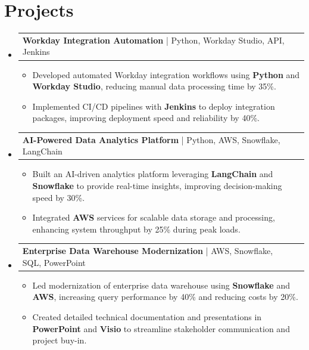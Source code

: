 \documentclass[letterpaper,11pt]{article}
\makeatletter
\newcommand{\resumeItem}[1]{
  \item\footnotesize{
    {#1 \vspace{-2pt}}
  }
}
\newcommand{\resumeProjectHeading}[2]{
    \item
    \begin{tabular*}{1.001\textwidth}{l@{\extracolsep{\fill}}r}
      \small#1 & \textbf{\small #2}\\
    \end{tabular*}\vspace{-7pt}
}
\newcommand{\resumeSubHeadingListStart}{\begin{itemize}[leftmargin=0pt, label={}]}
\newcommand{\resumeSubHeadingListEnd}{\end{itemize}}
\newcommand{\resumeItemListStart}{\begin{itemize}[leftmargin=*]}
\newcommand{\resumeItemListEnd}{\end{itemize}\vspace{-5pt}}
\makeatother
\begin{document}
\section{Projects}
    \vspace{-5pt}
    \resumeSubHeadingListStart

      \resumeProjectHeading
          {\textbf{Workday Integration Automation} | Python, Workday Studio, API, Jenkins}{ }
        \resumeItemListStart
            \resumeItem{Developed automated Workday integration workflows using \textbf{Python} and \textbf{Workday Studio}, reducing manual data processing time by 35\%.}
            \resumeItem{Implemented CI/CD pipelines with \textbf{Jenkins} to deploy integration packages, improving deployment speed and reliability by 40\%.}
        \resumeItemListEnd
        \vspace{-12pt}

      \resumeProjectHeading
          {\textbf{AI-Powered Data Analytics Platform} | Python, AWS, Snowflake, LangChain}{ }
        \resumeItemListStart
            \resumeItem{Built an AI-driven analytics platform leveraging \textbf{LangChain} and \textbf{Snowflake} to provide real-time insights, improving decision-making speed by 30\%.}
            \resumeItem{Integrated \textbf{AWS} services for scalable data storage and processing, enhancing system throughput by 25\% during peak loads.}
        \resumeItemListEnd
        \vspace{-12pt}

      \resumeProjectHeading
          {\textbf{Enterprise Data Warehouse Modernization} | AWS, Snowflake, SQL, PowerPoint}{ }
        \resumeItemListStart
            \resumeItem{Led modernization of enterprise data warehouse using \textbf{Snowflake} and \textbf{AWS}, increasing query performance by 40\% and reducing costs by 20\%.}
            \resumeItem{Created detailed technical documentation and presentations in \textbf{PowerPoint} and \textbf{Visio} to streamline stakeholder communication and project buy-in.}
        \resumeItemListEnd

    \resumeSubHeadingListEnd
\end{document}
